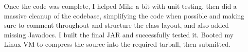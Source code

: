 \documentclass[letterpaper,10pt]{article}
\begin{document}
Once the code was complete, I helped Mike a bit with unit testing, then did a massive cleanup of the codebase, simplifying the code when possible and making sure to comment throughout and structure the class layout, and also added missing Javadocs. I built the final JAR and successfully tested it. Booted my Linux VM to compress the source into the required tarball, then submitted.

\pagebreak
\end{document}
